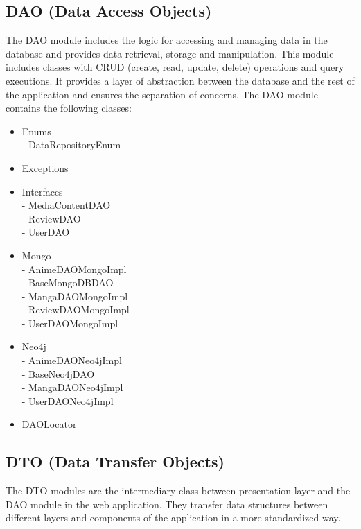 \subsection*{DAO (Data Access Objects)}
The DAO module includes the logic for accessing and managing data in the database and provides data retrieval, 
storage and manipulation. This module includes classes with CRUD (create, read, update, delete) operations and query executions. 
It provides a layer of abstraction between the database and the rest of the application and ensures the separation of concerns. The DAO module contains the following classes:
\begin{itemize}
    \item Enums \\
    - DataRepositoryEnum
    \item Exceptions 
    \item Interfaces \\
    - MedıaContentDAO \\
    - ReviewDAO \\
    - UserDAO 
    \item Mongo \\
    - AnimeDAOMongoImpl \\
    - BaseMongoDBDAO \\
    - MangaDAOMongoImpl \\
    - ReviewDAOMongoImpl \\
    - UserDAOMongoImpl 
    \item Neo4j \\
    - AnimeDAONeo4jImpl \\
    - BaseNeo4jDAO \\
    - MangaDAONeo4jImpl \\
    - UserDAONeo4jImpl 
    \item DAOLocator 
\end{itemize}

\subsection*{DTO (Data Transfer Objects)}
The DTO modules are the intermediary class between presentation layer and the DAO module in the web application.
They transfer data structures between different layers and components of the application in a more standardized way.


